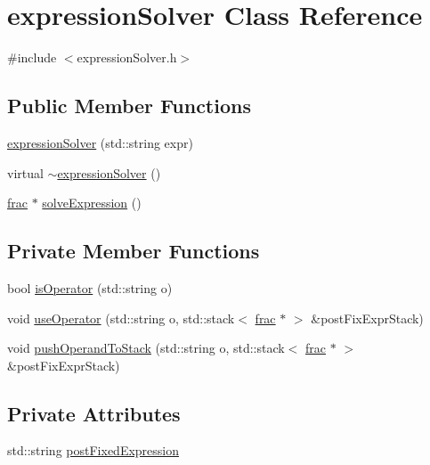 \hypertarget{classexpression_solver}{\section{expression\-Solver Class Reference}
\label{classexpression_solver}
}


{\ttfamily \#include $<$expression\-Solver.\-h$>$}

\subsection*{Public Member Functions}
\begin{DoxyCompactItemize}
\item 
\hyperlink{classexpression_solver_a3bc2225f65389cd369ebb7c2fd933d5f}{expression\-Solver} (std\-::string expr)
\item 
virtual \hyperlink{classexpression_solver_a9a059fc167c9d355c97fea904cd19ae5}{$\sim$expression\-Solver} ()
\item 
\hyperlink{classfrac}{frac} $\ast$ \hyperlink{classexpression_solver_ac8d610d2c8943061aa195764946bccc0}{solve\-Expression} ()
\end{DoxyCompactItemize}
\subsection*{Private Member Functions}
\begin{DoxyCompactItemize}
\item 
bool \hyperlink{classexpression_solver_a17e834de81946dd984a15d57304e863e}{is\-Operator} (std\-::string o)
\item 
void \hyperlink{classexpression_solver_af4cb3f31f5f43595d5947958d413ed65}{use\-Operator} (std\-::string o, std\-::stack$<$ \hyperlink{classfrac}{frac} $\ast$ $>$ \&post\-Fix\-Expr\-Stack)
\item 
void \hyperlink{classexpression_solver_a14c9fd87133114a2f98650429d8215b8}{push\-Operand\-To\-Stack} (std\-::string o, std\-::stack$<$ \hyperlink{classfrac}{frac} $\ast$ $>$ \&post\-Fix\-Expr\-Stack)
\end{DoxyCompactItemize}
\subsection*{Private Attributes}
\begin{DoxyCompactItemize}
\item 
std\-::string \hyperlink{classexpression_solver_aa57f733bd185dffaa4bd0d0ccbca1536}{post\-Fixed\-Expression}
\end{DoxyCompactItemize}



